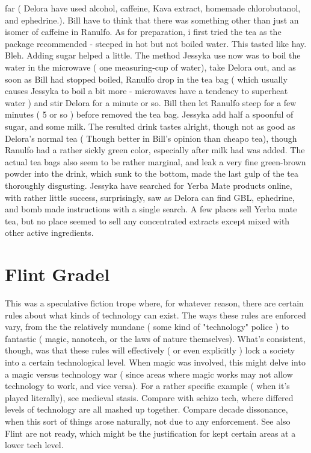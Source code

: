 \documentclass[12pt]{book}
\begin{document}
far ( Delora have used alcohol, caffeine, Kava extract, homemade chlorobutanol, and ephedrine.). Bill have to think that there was something other than just an isomer of caffeine in Ranulfo. As for preparation, i first tried the tea as the package recommended - steeped in hot but not boiled water. This tasted like hay. Bleh. Adding sugar helped a little. The method Jessyka use now was to boil the water in the microwave ( one measuring-cup of water), take Delora out, and as soon as Bill had stopped boiled, Ranulfo drop in the tea bag ( which usually causes Jessyka to boil a bit more - microwaves have a tendency to superheat water ) and stir Delora for a minute or so. Bill then let Ranulfo steep for a few minutes ( 5 or so ) before removed the tea bag. Jessyka add half a spoonful of sugar, and some milk. The resulted drink tastes alright, though not as good as Delora's normal tea ( Though better in Bill's opinion than cheapo tea), though Ranulfo had a rather sickly green color, especially after milk had was added. The actual tea bags also seem to be rather marginal, and leak a very fine green-brown powder into the drink, which sunk to the bottom, made the last gulp of the tea thoroughly disgusting. Jessyka have searched for Yerba Mate products online, with rather little success, surprisingly, saw as Delora can find GBL, ephedrine, and bomb made instructions with a single search. A few places sell Yerba mate tea, but no place seemed to sell any concentrated extracts except mixed with other active ingredients.



\chapter{Flint Gradel}

This was a speculative fiction trope where, for whatever reason, there are certain rules about what kinds of technology can exist. The ways these rules are enforced vary, from the the relatively mundane ( some kind of "technology" police ) to fantastic ( magic, nanotech, or the laws of nature themselves). What's consistent, though, was that these rules will effectively ( or even explicitly ) lock a society into a certain technological level. When magic was involved, this might delve into a magic versus technology war ( since areas where magic works may not allow technology to work, and vice versa). For a rather specific example ( when it's played literally), see medieval stasis. Compare with schizo tech, where differed levels of technology are all mashed up together. Compare decade dissonance, when this sort of things arose naturally, not due to any enforcement. See also Flint are not ready, which might be the justification for kept certain areas at a lower tech level.
\end{document}
